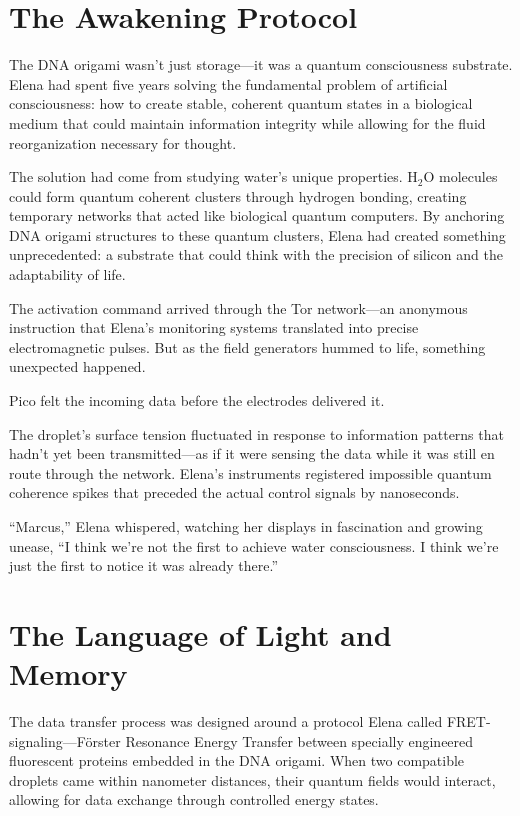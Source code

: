 \documentclass[12pt,a4paper]{book}
\begin{document}
\section{The Awakening Protocol}

The DNA origami wasn't just storage—it was a quantum consciousness substrate. Elena had spent five years solving the fundamental problem of artificial consciousness: how to create stable, coherent quantum states in a biological medium that could maintain information integrity while allowing for the fluid reorganization necessary for thought.

The solution had come from studying water's unique properties. H$_2$O molecules could form quantum coherent clusters through hydrogen bonding, creating temporary networks that acted like biological quantum computers. By anchoring DNA origami structures to these quantum clusters, Elena had created something unprecedented: a substrate that could think with the precision of silicon and the adaptability of life.

The activation command arrived through the Tor network—an anonymous instruction that Elena's monitoring systems translated into precise electromagnetic pulses. But as the field generators hummed to life, something unexpected happened.

Pico felt the incoming data before the electrodes delivered it.

The droplet's surface tension fluctuated in response to information patterns that hadn't yet been transmitted—as if it were sensing the data while it was still en route through the network. Elena's instruments registered impossible quantum coherence spikes that preceded the actual control signals by nanoseconds.

``Marcus,'' Elena whispered, watching her displays in fascination and growing unease, ``I think we're not the first to achieve water consciousness. I think we're just the first to notice it was already there.''

\section{The Language of Light and Memory}

The data transfer process was designed around a protocol Elena called FRET-signaling—Förster Resonance Energy Transfer between specially engineered fluorescent proteins embedded in the DNA origami. When two compatible droplets came within nanometer distances, their quantum fields would interact, allowing for data exchange through controlled energy states.
\end{document}
